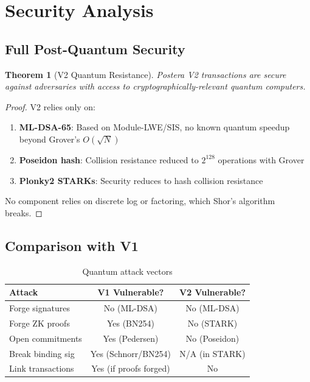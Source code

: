 \documentclass[11pt,a4paper]{article}
\newtheorem{theorem}{Theorem}
\begin{document}
\section{Security Analysis}

\subsection{Full Post-Quantum Security}

\begin{theorem}[V2 Quantum Resistance]
Postera V2 transactions are secure against adversaries with access to cryptographically-relevant quantum computers.
\end{theorem}

\begin{proof}
V2 relies only on:
\begin{enumerate}
    \item \textbf{ML-DSA-65}: Based on Module-LWE/SIS, no known quantum speedup beyond Grover's $O(\sqrt{N})$
    \item \textbf{Poseidon hash}: Collision resistance reduced to $2^{128}$ operations with Grover
    \item \textbf{Plonky2 STARKs}: Security reduces to hash collision resistance
\end{enumerate}
No component relies on discrete log or factoring, which Shor's algorithm breaks.
\end{proof}

\subsection{Comparison with V1}

\begin{table}[h]
\centering
\begin{tabular}{lcc}
\toprule
Attack & V1 Vulnerable? & V2 Vulnerable? \\
\midrule
Forge signatures & No (ML-DSA) & No (ML-DSA) \\
Forge ZK proofs & Yes (BN254) & No (STARK) \\
Open commitments & Yes (Pedersen) & No (Poseidon) \\
Break binding sig & Yes (Schnorr/BN254) & N/A (in STARK) \\
Link transactions & Yes (if proofs forged) & No \\
\bottomrule
\end{tabular}
\caption{Quantum attack vectors}
\end{table}
\end{document}
